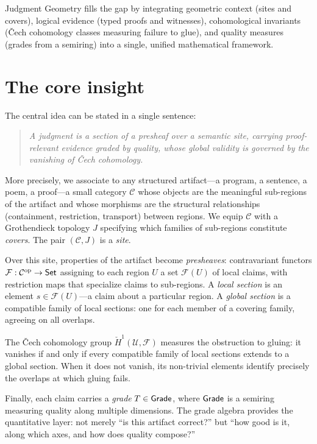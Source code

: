Judgment Geometry fills the gap by integrating geometric context
(sites and covers), logical evidence (typed proofs and witnesses),
cohomological invariants (\v{C}ech cohomology classes measuring
failure to glue), and quality measures (grades from a semiring) into a
single, unified mathematical framework.


\section{The core insight}
\label{sec:intro:insight}

The central idea can be stated in a single sentence:

\begin{quote}
\itshape
A judgment is a section of a presheaf over a semantic site, carrying
proof-relevant evidence graded by quality, whose global validity is
governed by the vanishing of \v{C}ech cohomology.
\end{quote}

More precisely, we associate to any structured artifact---a program, a
sentence, a poem, a proof---a small category $\mathcal{C}$ whose
objects are the meaningful sub-regions of the artifact and whose
morphisms are the structural relationships (containment, restriction,
transport) between regions.  We equip $\mathcal{C}$ with a
Grothendieck topology $J$ specifying which families of sub-regions
constitute \emph{covers}.  The pair $(\mathcal{C}, J)$ is a
\emph{site}.

Over this site, properties of the artifact become \emph{presheaves}:
contravariant functors $\mathcal{F} : \mathcal{C}^{\mathrm{op}} \to \mathsf{Set}$
assigning to each region $U$ a set $\mathcal{F}(U)$ of local claims,
with restriction maps that specialize claims to sub-regions.  A
\emph{local section} is an element $s \in \mathcal{F}(U)$---a claim
about a particular region.  A \emph{global section} is a compatible
family of local sections: one for each member of a covering family,
agreeing on all overlaps.

The \v{C}ech cohomology group $\check{H}^1(\mathcal{U}, \mathcal{F})$
measures the obstruction to gluing: it vanishes if and only if every
compatible family of local sections extends to a global section.  When
it does not vanish, its non-trivial elements identify precisely the
overlaps at which gluing fails.

Finally, each claim carries a \emph{grade} $T \in \mathsf{Grade}$, where
$\mathsf{Grade}$ is a semiring measuring quality along multiple dimensions.
The grade algebra provides the quantitative layer: not merely ``is
this artifact correct?'' but ``how good is it, along which axes, and
how does quality compose?''


